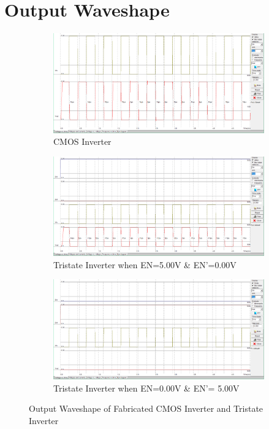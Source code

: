 \documentclass[a4paper,12pt]{article}
\begin{document}
\newpage
\section{Output Waveshape }
	\begin{figure}[H]
	\centering
	\begin{subfigure}[t]{1\textwidth}
		\centering
		\includegraphics[width=1\textwidth, height=0.27\textheight]{images/c/cisim1}
		\caption{CMOS Inverter}
		\label{fig:1}
	\end{subfigure}
	\begin{subfigure}[t]{1\textwidth}
		\centering
			\includegraphics[width=1\linewidth, height=0.29\textheight]{images/t/tisim1}
		\caption{Tristate Inverter when EN=5.00V \& EN'=0.00V}
		\label{fig:2}
	\end{subfigure}
	
		\begin{subfigure}[t]{1\textwidth}
		\centering
		\includegraphics[width=1\linewidth, height=0.29\textheight]{images/t/tisim2}
		\caption{Tristate Inverter when EN=0.00V \& EN'= 5.00V}
		\label{fig:2}
	\end{subfigure}
	\caption{Output Waveshape of Fabricated CMOS Inverter and Tristate Inverter}
\end{figure}
\end{document}
